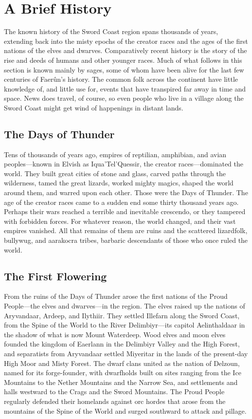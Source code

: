 \documentclass[10pt,a4paper,twoside,twocolumn,openany,bg=print,nodeprecatedcode]{dndbook}
\begin{document}
\section{A Brief History}
The known history of the Sword Coast region spans thousands of years, extending back into the misty epochs of the creator races and the ages of the first nations of the elves and dwarves. Comparatively recent history is the story of the rise and deeds of humans and other younger races.
Much of what follows in this section is known mainly by sages, some of whom have been alive for the last few centuries of Faerûn's history. The common folk across the continent have little knowledge of, and little use for, events that have transpired far away in time and space. News does travel, of course, so even people who live in a village along the Sword Coast might get wind of happenings in distant lands.
\subsection{The Days of Thunder}
Tens of thousands of years ago, empires of reptilian, amphibian, and avian peoples—known in Elvish as Iqua'Tel'Quessir, the creator races—dominated the world. They built great cities of stone and glass, carved paths through the wilderness, tamed the great lizards, worked mighty magics, shaped the world around them, and warred upon each other. Those were the Days of Thunder.
The age of the creator races came to a sudden end some thirty thousand years ago. Perhaps their wars reached a terrible and inevitable crescendo, or they tampered with forbidden forces. For whatever reason, the world changed, and their vast empires vanished. All that remains of them are ruins and the scattered lizardfolk, bullywug, and aarakocra tribes, barbaric descendants of those who once ruled the world.
\subsection{The First Flowering}
From the ruins of the Days of Thunder arose the first nations of the Proud People—the elves and dwarves—in the region.
The elves raised up the nations of Aryvandaar, Ardeep, and Ilythiir. They settled Illefarn along the Sword Coast, from the Spine of the World to the River Delimbiyr—its capitol Aelinthaldaar in the shadow of what is now Mount Waterdeep. Wood elves and moon elves founded the kingdom of Eaerlann in the Delimbiyr Valley and the High Forest, and separatists from Aryvandaar settled Miyeritar in the lands of the present-day High Moor and Misty Forest.
The dwarf clans united as the nation of Delzoun, named for its forge-founder, with dwarfholds built on sites ranging from the Ice Mountains to the Nether Mountains and the Narrow Sea, and settlements and halls westward to the Crags and the Sword Mountains.
The Proud People regularly defended their homelands against orc hordes that arose from the mountains of the Spine of the World and surged southward to attack and pillage.
\end{document}
